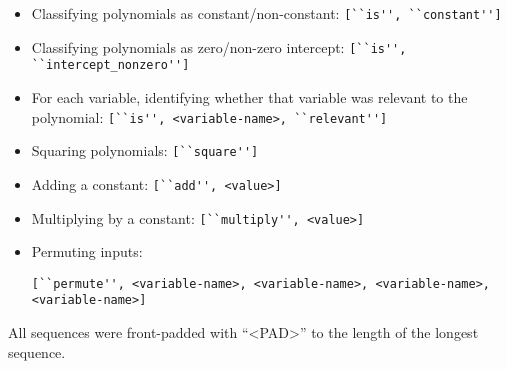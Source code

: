\documentclass{article}
\begin{document}
\begin{itemize}
\item Classifying polynomials as constant/non-constant: \verb|[``is'', ``constant'']|
\item Classifying polynomials as zero/non-zero intercept: \verb|[``is'', ``intercept_nonzero'']|
\item For each variable, identifying whether that variable was relevant to the polynomial: \verb|[``is'', <variable-name>, ``relevant'']|
\item Squaring polynomials: \verb|[``square'']|
\item Adding a constant: \verb|[``add'', <value>]|
\item Multiplying by a constant: \verb|[``multiply'', <value>]|
\item Permuting inputs: 
\begin{verbatim}[``permute'', <variable-name>, <variable-name>, <variable-name>, 
<variable-name>]\end{verbatim}
\end{itemize}
All sequences were front-padded with ``<PAD>'' to the length of the longest sequence.
\end{document}
